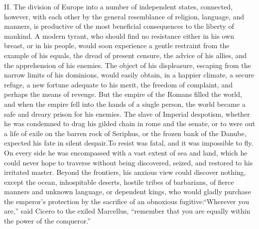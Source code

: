 

II. The division of Europe into a number of independent states,
connected, however, with each other by the general resemblance of
religion, language, and manners, is productive of the most
beneficial consequences to the liberty of mankind. A modern
tyrant, who should find no resistance either in his own breast,
or in his people, would soon experience a gentle restraint from
the example of his equals, the dread of present censure, the
advice of his allies, and the apprehension of his enemies. The
object of his displeasure, escaping from the narrow limits of his
dominions, would easily obtain, in a happier climate, a secure
refuge, a new fortune adequate to his merit, the freedom of
complaint, and perhaps the means of revenge. But the empire of
the Romans filled the world, and when the empire fell into the
hands of a single person, the world became a safe and dreary
prison for his enemies. The slave of Imperial despotism, whether
he was condemned to drag his gilded chain in rome and the senate,
or to were out a life of exile on the barren rock of Seriphus, or
the frozen bank of the Danube, expected his fate in silent
despair.\footnotemark[58] To resist was fatal, and it was impossible to fly. On
every side he was encompassed with a vast extent of sea and land,
which he could never hope to traverse without being discovered,
seized, and restored to his irritated master. Beyond the
frontiers, his anxious view could discover nothing, except the
ocean, inhospitable deserts, hostile tribes of barbarians, of
fierce manners and unknown language, or dependent kings, who
would gladly purchase the emperor’s protection by the sacrifice
of an obnoxious fugitive.\footnotemark[59] “Wherever you are,” said Cicero to
the exiled Marcellus, “remember that you are equally within the
power of the conqueror.”\footnotemark[60]

